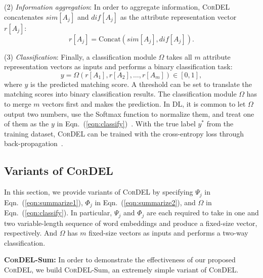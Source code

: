 \documentclass[conference]{IEEEtran}
\begin{document}
(2) \textit{Information aggregation}: In order to aggregate information, \textsc{CorDEL} concatenates $sim[A_j]$ and $dif[A_j]$ as the attribute representation vector $r[A_j]$:
\begin{equation}
     r[A_j] = \text{Concat}(sim[A_j], dif[A_j]).
\end{equation}

(3) \textit{Classification}: Finally, a classification module $\Omega$ takes all $m$ attribute representation vectors as inputs and performs a binary classification task:
\begin{equation}\label{eqn:classify}
    y = \Omega(r[A_1],r[A_2],\ldots,r[A_m]) \in [0,1],
\end{equation}
where $y$ is the predicted matching score. A threshold can be set to translate the matching scores into binary classification results. The classification module $\Omega$ has to merge $m$ vectors first and makes the prediction. In DL, it is common to let $\Omega$ output two numbers, use the Softmax function to normalize them, and treat one of them as the $y$ in Eqn.~(\ref{eqn:classify})~\cite{bishop2006pattern}. With the true label $y^*$ from the training dataset, \textsc{CorDEL} can be trained with the cross-entropy loss through back-propagation~\cite{lecun1998gradient}.

\subsection{Variants of \textsc{CorDEL}}\label{sec:CorDEL_variants}

In this section, we provide variants of \textsc{CorDEL} by specifying $\Psi_j$ in Eqn.~(\ref{eqn:summarize1}), $\Phi_j$ in Eqn.~(\ref{eqn:summarize2}), and $\Omega$ in Eqn.~(\ref{eqn:classify}). In particular, $\Psi_j$ and $\Phi_j$ are each required to take in one and two variable-length sequence of word embeddings and produce a fixed-size vector, respectively. And $\Omega$ has $m$ fixed-size vectors as inputs and performs a two-way classification.

\textbf{\textsc{CorDEL}-Sum:} In order to demonstrate the effectiveness of our proposed \textsc{CorDEL}, we build \textsc{CorDEL}-Sum, an extremely simple variant of \textsc{CorDEL}.
\end{document}
